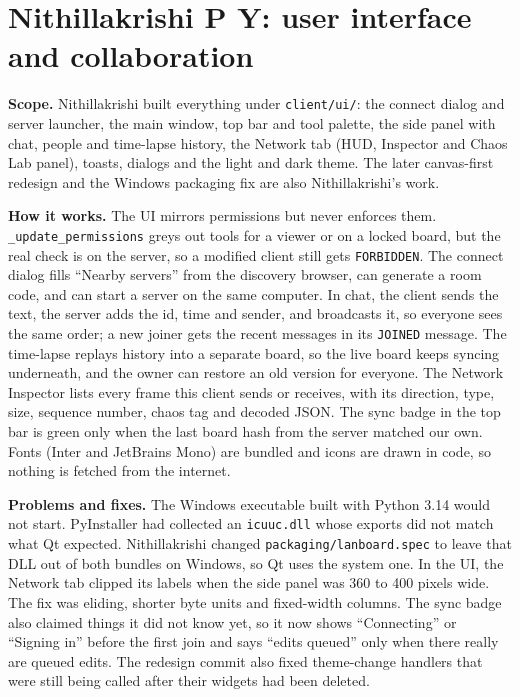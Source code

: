 \documentclass[11pt,a4paper]{article}
\newcommand{\file}[1]{\texttt{#1}}
\begin{document}
\section{Nithillakrishi P Y: user interface and collaboration}

\textbf{Scope.} Nithillakrishi built everything under \file{client/ui/}: the connect
dialog and server launcher, the main window, top bar and tool palette, the side panel with chat,
people and time-lapse history, the Network tab (HUD, Inspector and Chaos Lab panel), toasts,
dialogs and the light and dark theme. The later canvas-first redesign and the Windows
packaging fix are also Nithillakrishi's work.

\textbf{How it works.} The UI mirrors permissions but never enforces them. \file{\_update\_permissions}
greys out tools for a viewer or on a locked board, but the real check is on the server, so a
modified client still gets \texttt{FORBIDDEN}. The connect dialog fills ``Nearby servers'' from
the discovery browser, can generate a room code, and can start a server on the same computer. In
chat, the client sends the text, the server adds the id, time and sender, and broadcasts it, so
everyone sees the same order; a new joiner gets the recent messages in its \texttt{JOINED}
message. The time-lapse replays history into a separate board, so the live board keeps syncing
underneath, and the owner can restore an old version for everyone. The Network Inspector lists
every frame this client sends or receives, with its direction, type, size, sequence number, chaos
tag and decoded JSON. The sync badge in the top bar is green only when the last board hash from
the server matched our own. Fonts (Inter and JetBrains Mono) are bundled and icons are drawn in
code, so nothing is fetched from the internet.

\textbf{Problems and fixes.} The Windows executable built with Python 3.14 would not start.
PyInstaller had collected an \file{icuuc.dll} whose exports did not match what Qt expected.
Nithillakrishi changed \file{packaging/lanboard.spec} to leave that DLL out of both bundles on
Windows, so Qt uses the system one. In the UI, the Network tab clipped its labels when the side
panel was 360 to 400 pixels wide. The fix was eliding, shorter byte units and fixed-width columns.
The sync badge also claimed things it did not know yet, so it now shows ``Connecting'' or
``Signing in'' before the first join and says ``edits queued'' only when there really are queued
edits. The redesign commit also fixed theme-change handlers that were still being called
after their widgets had been deleted.
\end{document}
